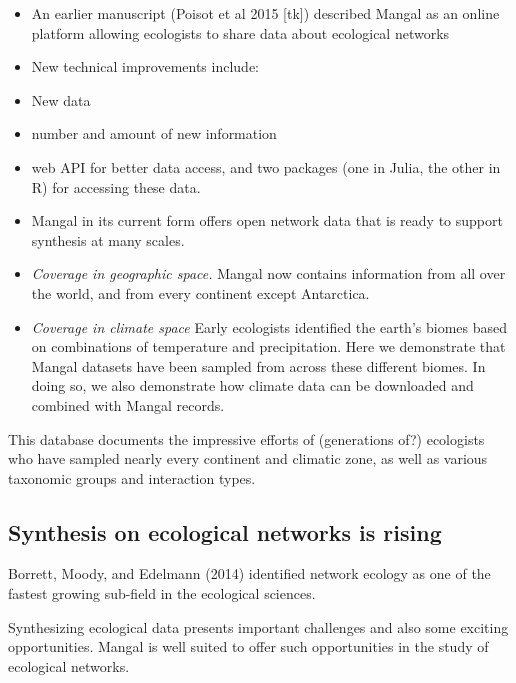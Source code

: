 \begin{itemize}
\tightlist
\item
  An earlier manuscript (Poisot et al 2015 {[}tk{]}) described Mangal as
  an online platform allowing ecologists to share data about ecological
  networks
\item
  New technical improvements include:
\item
  New data
\item
  number and amount of new information
\item
  web API for better data access, and two packages (one in Julia, the
  other in R) for accessing these data.
\item
  Mangal in its current form offers open network data that is ready to
  support synthesis at many scales.
\end{itemize}

\begin{itemize}
\item
  \emph{Coverage in geographic space.} Mangal now contains information
  from all over the world, and from every continent except Antarctica. 
\item
  \emph{Coverage in climate space} Early ecologists identified the
  earth's biomes based on combinations of temperature and precipitation.
  Here we demonstrate that Mangal datasets have been sampled from across
  these different biomes. In doing so, we also demonstrate how climate
  data can be downloaded and combined with Mangal records. 
\end{itemize}

This database documents the impressive efforts of (generations of?)
ecologists who have sampled nearly every continent and climatic zone, as
well as various taxonomic groups and interaction types.

\hypertarget{synthesis-on-ecological-networks-is-rising}{%
\subsection{Synthesis on ecological networks is
rising}\label{synthesis-on-ecological-networks-is-rising}}

Borrett, Moody, and Edelmann (2014) identified network ecology as one of
the fastest growing sub-field in the ecological sciences.

Synthesizing ecological data presents important challenges and also some
exciting opportunities. Mangal is well suited to offer such
opportunities in the study of ecological networks.

